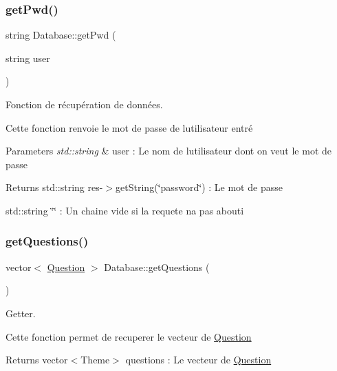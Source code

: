 \subsubsection{\texorpdfstring{get\+Pwd()}{getPwd()}}
{\footnotesize\ttfamily string Database\+::get\+Pwd (\begin{DoxyParamCaption}\item[{string}]{user }\end{DoxyParamCaption})}



Fonction de récupération de données. 

Cette fonction renvoie le mot de passe de l\textquotesingle{}utilisateur entré 
\begin{DoxyParams}{Parameters}
{\em std\+::string} & user \+: Le nom de l\textquotesingle{}utilisateur dont on veut le mot de passe \\
\hline
\end{DoxyParams}
\begin{DoxyReturn}{Returns}
std\+::string res-\/$>$get\+String(\char`\"{}password\char`\"{}) \+: Le mot de passe 

std\+::string \char`\"{}\char`\"{} \+: Un chaine vide si la requete n\textquotesingle{}a pas abouti 
\end{DoxyReturn}
\mbox{\label{classDatabase_ae1aff982221c7ed188e1ce3ed00f878d}} 
\subsubsection{\texorpdfstring{get\+Questions()}{getQuestions()}}
{\footnotesize\ttfamily vector$<$ \mbox{\hyperlink{classQuestion}{Question}} $>$ Database\+::get\+Questions (\begin{DoxyParamCaption}{ }\end{DoxyParamCaption})}



Getter. 

Cette fonction permet de recuperer le vecteur de \mbox{\hyperlink{classQuestion}{Question}} \begin{DoxyReturn}{Returns}
vector$<$\+Theme$>$ questions \+: Le vecteur de \mbox{\hyperlink{classQuestion}{Question}} 
\end{DoxyReturn}
\mbox{\label{classDatabase_a4cc8ad17cfd1cbf1074e56aa1e2eb71d}} 
